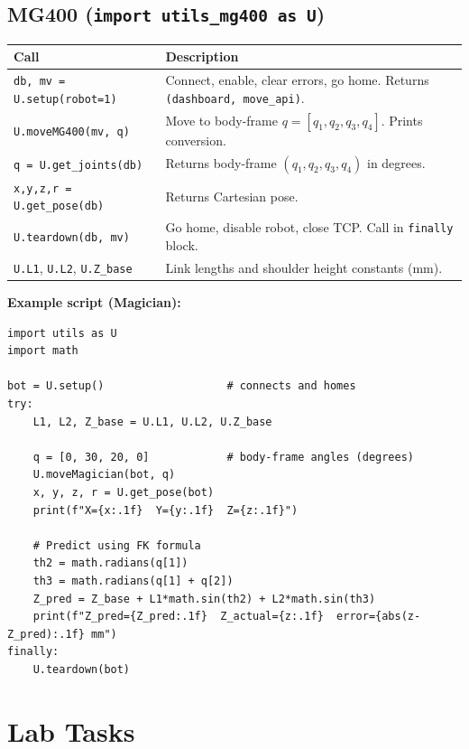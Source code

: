 \documentclass[11pt,a4paper]{article}
\begin{document}
\vspace{6pt}
\subsection*{MG400 (\texttt{import utils\_mg400 as U})}

\begin{tabularx}{\linewidth}{@{}lX@{}}
  \toprule
  \textbf{Call} & \textbf{Description} \\
  \midrule
  \texttt{db, mv = U.setup(robot=1)} &
    Connect, enable, clear errors, go home. Returns \texttt{(dashboard, move\_api)}. \\
  \texttt{U.moveMG400(mv, q)} &
    Move to body-frame $q=[q_1,q_2,q_3,q_4]$. Prints conversion. \\
  \texttt{q = U.get\_joints(db)} &
    Returns body-frame $(q_1,q_2,q_3,q_4)$ in degrees. \\
  \texttt{x,y,z,r = U.get\_pose(db)} &
    Returns Cartesian pose. \\
  \texttt{U.teardown(db, mv)} &
    Go home, disable robot, close TCP. Call in \texttt{finally} block. \\
  \midrule
  \texttt{U.L1}, \texttt{U.L2}, \texttt{U.Z\_base} &
    Link lengths and shoulder height constants (mm). \\
  \bottomrule
\end{tabularx}

\vspace{6pt}
\textbf{Example script (Magician):}

\begin{lstlisting}[style=PythonStyle]
import utils as U
import math

bot = U.setup()                   # connects and homes
try:
    L1, L2, Z_base = U.L1, U.L2, U.Z_base

    q = [0, 30, 20, 0]            # body-frame angles (degrees)
    U.moveMagician(bot, q)
    x, y, z, r = U.get_pose(bot)
    print(f"X={x:.1f}  Y={y:.1f}  Z={z:.1f}")

    # Predict using FK formula
    th2 = math.radians(q[1])
    th3 = math.radians(q[1] + q[2])
    Z_pred = Z_base + L1*math.sin(th2) + L2*math.sin(th3)
    print(f"Z_pred={Z_pred:.1f}  Z_actual={z:.1f}  error={abs(z-Z_pred):.1f} mm")
finally:
    U.teardown(bot)
\end{lstlisting}

\section{Lab Tasks}
\end{document}
